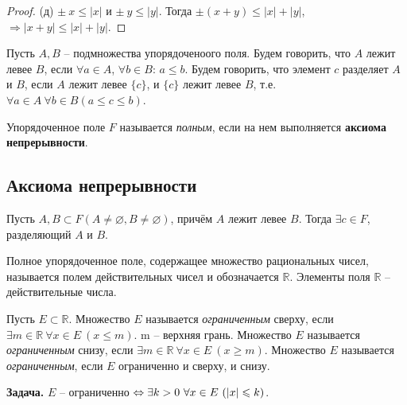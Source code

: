     \begin{proof}
        (д) $\pm \  x \leq |x|$ и $\pm \  y \leq |y|$. Тогда $\pm (x + y) \leq |x| + |y|$, $\Rightarrow |x + y| \leq |x| + |y|$.
    \end{proof}
    
    \begin{definition}
        Пусть $A, B$ -- подмножества упорядоченоого поля. Будем говорить, что $A$ лежит левее $B$, если $\forall a \in A$, $\forall b \in B$: $a \leq b$. Будем говорить, что элемент $c$ разделяет $A$ и $B$, если $A$ лежит левее $\{c\}$, и $\{c\}$ лежит левее $B$, т.е. $\forall a \in A \ \forall b \in B (a \leq c \leq b)$. 
    \end{definition}
    
    \begin{definition}
        Упорядоченное поле $F$ называется \textit{полным}, если на нем выполняется \textbf{аксиома непрерывности}.
    \end{definition}

\subsection{Аксиома непрерывности}

    Пусть $A, B \subset F (A \neq \varnothing, B \neq \varnothing)$, причём $A$ лежит левее $B$. Тогда $\exists c \in F$, разделяющий $A$ и $B$.
    
    \begin{definition}
        Полное упорядоченное поле, содержащее множество рациональных чисел, называется полем действительных чисел и обозначается $\mathds{R}$. Элементы поля $\mathds{R}$ -- действительные числа.
    \end{definition}
    
    \begin{definition}
        Пусть $E \subset \mathds{R}$. Множество $E$ называется \textit{ограниченным} сверху, если $\exists m \in \mathds{R} \  \forall x \in E \ (x \leq m)$. m -- верхняя грань.
        Множество $E$ называется \textit{ограниченным} снизу, если $\exists m \in \mathds{R} \  \forall x \in E \ (x \geq m)$.
        Множество $E$ называется \textit{ограниченным}, если $E$ ограниченно и сверху, и снизу.
    \end{definition}
    
    \textbf{Задача.} $E$ -- ограниченно $\Leftrightarrow \exists k > 0 \  \forall x \in E \ (|x| \leqslant k)$.
    